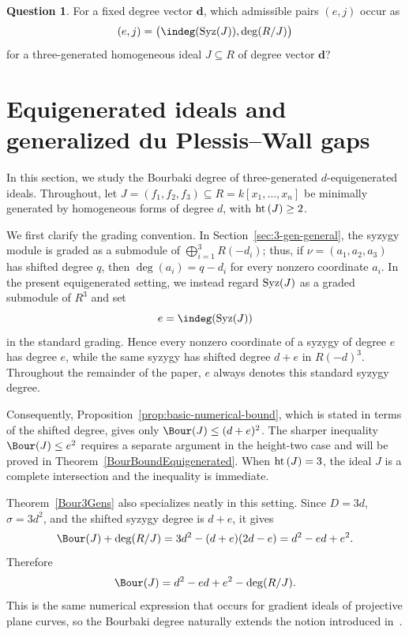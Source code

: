\documentclass[11pt]{amsart} %
\theoremstyle{definition}
\newtheorem{Question}[Theorem]{Question}
\def\hht{{\rm ht}\,}
\def\syz{\mbox{\rm Syz}}
\def\hht{{\rm ht}\,}
\begin{document}
\begin{Question}\label{ques:structural-spectrum}
For a fixed degree vector $\mathbf d$, which admissible pairs $(e,j)$ occur as
\[
(e,j)=\bigl(\indeg(\syz(J)),\deg(R/J)\bigr)
\]
for a three-generated homogeneous ideal $J\subseteq R$ of degree vector
$\mathbf d$?
\end{Question}

\section{Equigenerated ideals and generalized du Plessis--Wall gaps}
\label{sec:equigenerated}

In this section, we study the Bourbaki degree of three-generated
$d$-equigenerated ideals. Throughout, let
$J=(f_1,f_2,f_3)\subseteq R=k[x_1,\ldots,x_n]$ be minimally generated by
homogeneous forms of degree $d$, with $\hht(J)\ge2$.

We first clarify the grading convention. In Section~\ref{sec:3-gen-general},
the syzygy module is graded as a submodule of
$\bigoplus_{i=1}^3R(-d_i)$; thus, if
$\nu=(a_1,a_2,a_3)$ has shifted degree $q$, then
$\deg(a_i)=q-d_i$ for every nonzero coordinate $a_i$. In the present
equigenerated setting, we instead regard $\syz(J)$ as a graded submodule of
$R^3$ and set
\[
e=\indeg(\syz(J))
\]
in the standard grading. Hence every nonzero coordinate of a syzygy of
degree $e$ has degree $e$, while the same syzygy has shifted degree $d+e$
in $R(-d)^3$. Throughout the remainder of the paper, $e$ always denotes this standard
syzygy degree.

Consequently, Proposition~\ref{prop:basic-numerical-bound}, which is stated
in terms of the shifted degree, gives only
$\Bour(J)\le(d+e)^2$. The sharper inequality
$\Bour(J)\le e^2$ requires a separate argument in the height-two case and
will be proved in Theorem~\ref{BourBoundEquigenerated}. When
$\hht(J)=3$, the ideal $J$ is a complete intersection and the inequality
is immediate.

Theorem~\ref{Bour3Gens} also specializes neatly in this setting. Since
$D=3d$, $\sigma=3d^2$, and the shifted syzygy degree is $d+e$, it gives
\[
\Bour(J)+\deg(R/J)
=3d^2-(d+e)(2d-e)
=d^2-ed+e^2.
\]
Therefore
\begin{equation}\label{bourequigeneratedformula}
\Bour(J)=d^2-ed+e^2-\deg(R/J).
\end{equation}
This is the same numerical expression that occurs for gradient ideals of
projective plane curves, so the Bourbaki degree naturally extends the
notion introduced in~\cite{MAA}.
\end{document}
